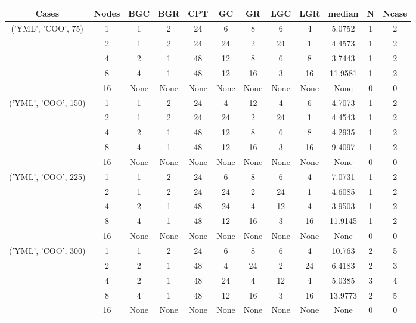 \begin{tabular}{cccccccccccc}
\hline
Cases & Nodes& BGC& BGR& CPT& GC& GR& LGC& LGR& median & N & Ncase \\
\hline
\multirow{5}{*}{('YML', 'COO', 75)}& 1& 1& 2& 24& 6& 8& 6& 4& 5.0752& 1& 2\\
& 2& 1& 2& 24& 24& 2& 24& 1& 4.4573& 1& 2\\
& 4& 2& 1& 48& 12& 8& 6& 8& 3.7443& 1& 2\\
& 8& 4& 1& 48& 12& 16& 3& 16& 11.9581& 1& 2\\
& 16& None& None& None& None& None& None& None& None& 0& 0\\
\hline
\multirow{5}{*}{('YML', 'COO', 150)}& 1& 1& 2& 24& 4& 12& 4& 6& 4.7073& 1& 2\\
& 2& 1& 2& 24& 24& 2& 24& 1& 4.4543& 1& 2\\
& 4& 2& 1& 48& 12& 8& 6& 8& 4.2935& 1& 2\\
& 8& 4& 1& 48& 12& 16& 3& 16& 9.4097& 1& 2\\
& 16& None& None& None& None& None& None& None& None& 0& 0\\
\hline
\multirow{5}{*}{('YML', 'COO', 225)}& 1& 1& 2& 24& 6& 8& 6& 4& 7.0731& 1& 2\\
& 2& 1& 2& 24& 24& 2& 24& 1& 4.6085& 1& 2\\
& 4& 2& 1& 48& 24& 4& 12& 4& 3.9503& 1& 2\\
& 8& 4& 1& 48& 12& 16& 3& 16& 11.9145& 1& 2\\
& 16& None& None& None& None& None& None& None& None& 0& 0\\
\hline
\multirow{5}{*}{('YML', 'COO', 300)}& 1& 1& 2& 24& 6& 8& 6& 4& 10.763& 2& 5\\
& 2& 2& 1& 48& 4& 24& 2& 24& 6.4183& 2& 3\\
& 4& 2& 1& 48& 24& 4& 12& 4& 5.0385& 3& 4\\
& 8& 4& 1& 48& 12& 16& 3& 16& 13.9773& 2& 5\\
& 16& None& None& None& None& None& None& None& None& 0& 0\\
\hline
\end{tabular}



